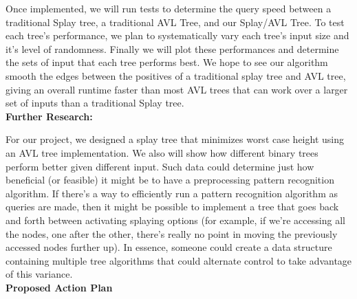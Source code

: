 \documentclass[11pt]{article}
\begin{document}
Once implemented, we will run tests to determine the query speed between 
a traditional Splay tree, a traditional AVL Tree, and our Splay/AVL Tree.
To test each tree's performance, we plan to systematically vary each tree's
input size and it's level of randomness. Finally we will plot these
performances and determine the sets of input that each tree performs best.
We hope to see our algorithm smooth the edges between the positives of a
traditional splay tree and AVL tree, giving an overall runtime faster than
most AVL trees that can work over a larger set of inputs than a traditional
Splay tree.\\


\textbf{Further Research:}
\vspace{2mm}

	For our project, we designed a splay tree that minimizes worst case height using an AVL tree implementation. We also will show how different binary trees perform better given different input. Such data could determine just how beneficial (or feasible) it might be to have a preprocessing pattern recognition algorithm. If there’s a way to efficiently run a pattern recognition algorithm as queries are made, then it might be possible to implement a tree that goes back and forth between activating splaying options (for example, if we’re accessing all the nodes, one after the other, there’s really no point in moving the previously accessed nodes further up). In essence, someone could create a data structure containing multiple tree algorithms that could alternate control to take advantage of this variance.\\


{\textbf{Proposed Action Plan}}
\vspace{2mm}
\end{document}
